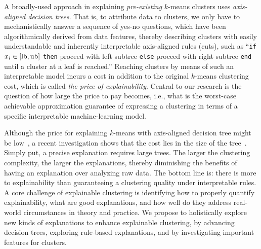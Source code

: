 \documentclass[a4paper,11pt]{article}
\begin{document}
A broadly-used \posthoc approach in explaining \emph{pre-existing} $k$-means clusters uses 
\emph{axis-aligned decision trees}. 
That is, to attribute data to clusters, 
we only have to mechanistically answer a sequence of yes-no questions, 
which have been algorithmically derived from data features, 
thereby describing clusters with easily understandable and inherently interpretable axis-aligned rules (cuts), 
such as ``\texttt{if} $x_i \in [\textnormal{lb}, \textnormal{ub}]$ \texttt{then} 
proceed with left sub\-tree \texttt{else} proceed with right sub\-tree \texttt{end} until a cluster at a leaf is reached.''
Reaching clusters by means of such an interpretable model incurs 
a cost in addition to the original $k$-means clustering cost, 
which is called \emph{the price of explainability}.
Central to our research is the question of how large the price to pay becomes, i.e., 
what is the worst-case achievable approximation guarantee of expressing a clustering 
in terms of a specific interpretable machine-learning model. 

Although the price for explaining $k$-means with axis-aligned decision tree might be low~\cite{gupta2023price}, 
a recent investigation shows that the cost lies in the size of the tree~\cite{deng2023impossibility}.
Simply put, a precise explanation requires large trees.
The larger the clustering complexity, the larger the explanations, thereby 
diminishing the benefits of having an explanation over analyzing raw data.
The bottom line is: there is more to explainability than guaranteeing a clustering quality under interpretable rules.
A core challenge of explainable clustering is identifying how to properly quantify explainability,
what are good explanations, and how well do they address real-world circumstances in theory and practice.
We propose to holistically explore new kinds of explanations to enhance explainable clustering,
by advancing decision trees, exploring rule-based explanations, and by investigating important features for clusters.
\end{document}
